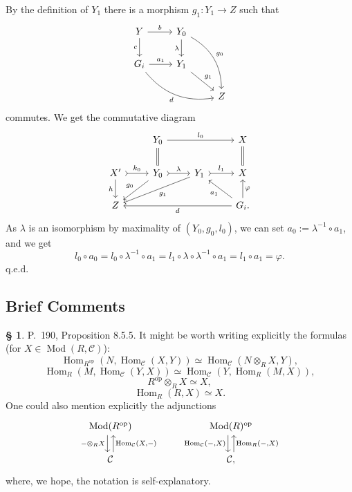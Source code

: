 \documentclass[12pt]{article}%
\theoremstyle{remark}
\theoremstyle{definition}
\newtheorem{s}[thm]{\S}%
\newcommand{\C}{\mathcal C}
\newcommand{\pp}{\varphi}
\DeclareMathOperator{\Hom}{Hom}%
\DeclareMathOperator{\Mod}{Mod}
\DeclareMathOperator{\op}{op}
\begin{document}
By the definition of $Y_1$ there is a morphism $g_1:Y_1\to Z$ such that 
$$
\begin{tikzcd}
Y\ar{r}{b}\ar[swap]{d}{c}&Y_0\ar{d}[swap]{\lambda}\ar[bend left]{ddr}{g_0}\\
G_i\ar{r}{a_1}\ar[bend right]{rrd}[swap]{d}&Y_1\ar{dr}{g_1}\\ 
{}&{}&Z
\end{tikzcd}
$$ 
commutes. We get the commutative diagram
$$
\begin{tikzcd}
{}&Y_0\ar[equal]{d}\ar{rr}{l_0}&&X\ar[equal]{d}\\ 
X'\ar{d}[swap]{h}\ar[tail]{r}{k_0}&Y_0\ar{dl}[swap]{g_0}\ar[tail]{r}{\lambda}&Y_1\ar{dll}{g_1}\ar[tail]{r}{l_1}&X\\ 
Z&&&G_i.\ar{u}[swap]{\varphi}\ar{lll}{d}\ar{ul}{a_1}
\end{tikzcd}
$$ 
As $\lambda$ is an isomorphism by maximality of $(Y_0,g_0,l_0)$, we can set $a_0:=\lambda^{-1}\circ a_1$, and we get 
$$
l_0\circ a_0=l_0\circ\lambda^{-1}\circ a_1=l_1\circ\lambda\circ\lambda^{-1}\circ a_1=l_1\circ a_1=\pp.
$$ 
q.e.d.


\subsection{Brief Comments}

\begin{s} P.~190, Proposition 8.5.5. It might be worth writing explicitly the formulas (for $X\in\Mod(R,\C)$):
$$
\Hom_{R^{\op}}(N,\Hom_\C(X,Y))\simeq
\Hom_\C\left(N\otimes_RX,Y\right),
$$
$$
\Hom_R(M,\Hom_\C(Y,X))\simeq
\Hom_\C\left(Y,\Hom_R(M,X)\right),
$$
$$
R^{\op}\otimes_RX\simeq X,
$$
$$
\Hom_R(R,X)\simeq X.
$$
One could also mention explicitly the adjunctions
$$
\begin{tikzcd}
\Mod(R^{\op})\ar[xshift=-0.7ex]{d}[swap]{-\otimes_RX}&&&
\Mod(R)^{\op}\ar[xshift=-0.7ex]{d}[swap]{\Hom_\C(-,X)}\\
\C\ar[xshift=0.7ex]{u}[swap]{\Hom_\C(X,-)}&&&\C,\ar[xshift=0.7ex]{u}[swap]{\Hom_R(-,X)}
\end{tikzcd}
$$
where, we hope, the notation is self-explanatory.
\end{s}

%
\end{document}
